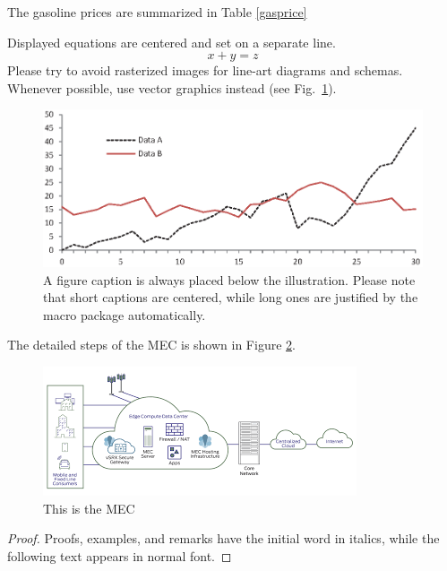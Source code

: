 \documentclass[runningheads]{llncs}
\begin{document}
The gasoline prices are summarized in Table \ref{gasprice}



\noindent Displayed equations are centered and set on a separate
line.
\begin{equation}
x + y = z
\end{equation}
Please try to avoid rasterized images for line-art diagrams and
schemas. Whenever possible, use vector graphics instead (see
Fig.~\ref{fig1}).

\begin{figure}
\includegraphics[width=\textwidth]{fig1.eps}
\caption{A figure caption is always placed below the illustration.
Please note that short captions are centered, while long ones are
justified by the macro package automatically.} 
\label{fig1}
\end{figure}

The detailed steps of the MEC is shown in Figure \ref{mecFig}.

\begin{figure}
\includegraphics[width=\textwidth]{mecomputing.png}
\caption{This is the MEC} 
\label{mecFig}
\end{figure}

%
%
\begin{proof}
Proofs, examples, and remarks have the initial word in italics,
while the following text appears in normal font.
\end{proof}
\end{document}
